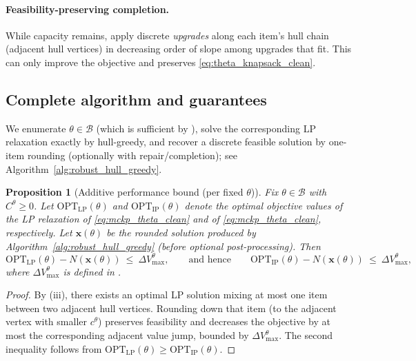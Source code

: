 \documentclass[11pt, a4paper]{article}
\theoremstyle{plain}
\newtheorem{proposition}[proposition]{Proposition}
\theoremstyle{definition}
\theoremstyle{remark}
\begin{document}
\paragraph{Feasibility-preserving completion.}
While capacity remains, apply discrete \emph{upgrades} along each item's hull chain (adjacent hull vertices) in decreasing order of slope
among upgrades that fit. This can only improve the objective and preserves \eqref{eq:theta_knapsack_clean}.

\subsection{Complete algorithm and guarantees}\label{subsec:rg_full}

We enumerate $\theta\in\mathcal B$ (which is sufficient by ), solve the corresponding LP
relaxation exactly by hull-greedy, and recover a discrete feasible solution by one-item rounding (optionally with repair/completion); see
Algorithm~\ref{alg:robust_hull_greedy}.

\begin{proposition}[Additive performance bound (per fixed $\theta$)]\label{prop:rg_additive_theta}
Fix $\theta\in\mathcal B$ with $C^\theta\ge 0$. Let $\mathrm{OPT}_{\mathrm{LP}}(\theta)$ and $\mathrm{OPT}_{\mathrm{IP}}(\theta)$ denote the
optimal objective values of the LP relaxation of \eqref{eq:mckp_theta_clean} and of \eqref{eq:mckp_theta_clean}, respectively.
Let $\bm x(\theta)$ be the rounded solution produced by Algorithm~\ref{alg:robust_hull_greedy} (before optional post-processing). Then
\[
\mathrm{OPT}_{\mathrm{LP}}(\theta)-N(\bm x(\theta))\ \le\ \Delta V_{\max}^\theta,
\qquad\text{and hence}\qquad
\mathrm{OPT}_{\mathrm{IP}}(\theta)-N(\bm x(\theta))\ \le\ \Delta V_{\max}^\theta,
\]
where $\Delta V_{\max}^\theta$ is defined in .
\end{proposition}

\begin{proof}
By (iii), there exists an optimal LP solution mixing at most one item between two adjacent hull vertices.
Rounding down that item (to the adjacent vertex with smaller $c^\theta$) preserves feasibility and decreases the objective by at most the
corresponding adjacent value jump, bounded by $\Delta V_{\max}^\theta$. The second inequality follows from
$\mathrm{OPT}_{\mathrm{LP}}(\theta)\ge \mathrm{OPT}_{\mathrm{IP}}(\theta)$.
\end{proof}
\end{document}
